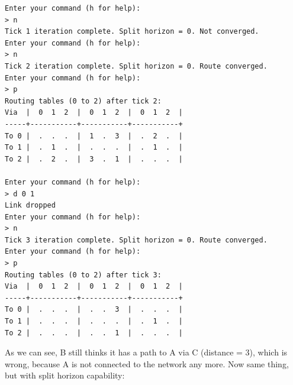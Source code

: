 \documentclass[english,11pt]{article}
\newcommand{\ok}{\fontsize{9}{11}\selectfont}
\begin{document}
{\ok
\begin{verbatim}
Enter your command (h for help):
> n
Tick 1 iteration complete. Split horizon = 0. Not converged.
Enter your command (h for help):
> n
Tick 2 iteration complete. Split horizon = 0. Route converged.
Enter your command (h for help):
> p
Routing tables (0 to 2) after tick 2:
Via  |  0  1  2  |  0  1  2  |  0  1  2  |
-----+-----------+-----------+-----------+
To 0 |  .  .  .  |  1  .  3  |  .  2  .  |
To 1 |  .  1  .  |  .  .  .  |  .  1  .  |
To 2 |  .  2  .  |  3  .  1  |  .  .  .  |

Enter your command (h for help):
> d 0 1
Link dropped
Enter your command (h for help):
> n
Tick 3 iteration complete. Split horizon = 0. Route converged.
Enter your command (h for help):
> p
Routing tables (0 to 2) after tick 3:
Via  |  0  1  2  |  0  1  2  |  0  1  2  |
-----+-----------+-----------+-----------+
To 0 |  .  .  .  |  .  .  3  |  .  .  .  |
To 1 |  .  .  .  |  .  .  .  |  .  1  .  |
To 2 |  .  .  .  |  .  .  1  |  .  .  .  |
\end{verbatim}
}

As we can see, B still thinks it has a path to A via C (distance = 3), which is
wrong, because A is not connected to the network any more. Now same thing, but
with split horizon capability:
\clearpage
\end{document}
